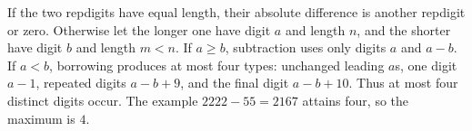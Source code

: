 If the two repdigits have equal length, their absolute difference is another repdigit or zero. Otherwise let the longer one have digit $a$ and length $n$, and the shorter have digit $b$ and length $m<n$. If $a\ge b$, subtraction uses only digits $a$ and $a-b$. If $a<b$, borrowing produces at most four types: unchanged leading $a$s, one digit $a-1$, repeated digits $a-b+9$, and the final digit $a-b+10$. Thus at most four distinct digits occur. The example $2222-55=2167$ attains four, so the maximum is $\boxed4$.
